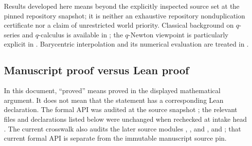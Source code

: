 Results developed here means beyond the explicitly inspected source set at
the pinned repository snapshot; it is neither an exhaustive repository
nonduplication certificate nor a claim of unrestricted world priority.
Classical background
on $q$-series and $q$-calculus is available in
\cite{Andrews1986,GasperRahman2004,KacCheung2002,DLMF17}; the $q$-Newton
viewpoint is particularly explicit in \cite{Kupershmidt2000}.  Barycentric
interpolation and its numerical evaluation are treated in
\cite{BerrutTrefethen2004,Higham2004}.

\subsection{Manuscript proof versus Lean proof}
\label{gq:sec:lean-boundary}

In this document, ``proved'' means proved in the displayed mathematical
argument.  It does not mean that the statement has a corresponding Lean
declaration.  The formal API was audited at the source snapshot
; the relevant files and
declarations listed below were unchanged when rechecked at intake head
.  The current crosswalk also
audits the later source modules
,
, and
, and
; that current formal API is
separate from the immutable manuscript source pin.

